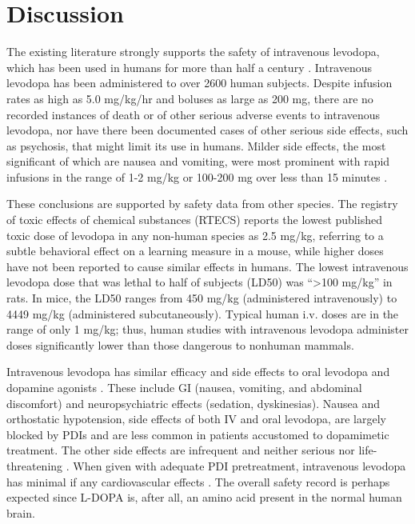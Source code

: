 \section{Discussion}
The existing literature strongly supports the safety of intravenous levodopa, which has been used in humans for more than half a century \cite{14430381}.  Intravenous levodopa has been administered to over 2600 human subjects.  Despite infusion rates as high as 5.0 mg/kg/hr and boluses as large as 200 mg, there are no recorded instances of death or of other serious adverse events to intravenous levodopa, nor have there been documented cases of other serious side effects, such as psychosis, that might limit its use in humans. Milder side effects, the most significant of which are nausea and vomiting, were most prominent with rapid infusions in the range of 1-2 mg/kg or 100-200 mg over less than 15 minutes \cite{5327616,Bbrung_1966,12865145,4555619,6540399,4880674}. 

These conclusions are supported by safety data from other species. The registry of toxic effects of chemical substances (RTECS) reports the lowest published toxic dose of levodopa in any non-human species as 2.5 mg/kg, referring to a subtle behavioral effect on a learning measure in a mouse, while higher doses have not been reported to cause similar effects in humans.  The lowest intravenous levodopa dose that was lethal to half of subjects (LD50) was ``>100 mg/kg'' in rats.  In mice, the LD50 ranges from 450 mg/kg (administered intravenously) to 4449 mg/kg (administered subcutaneously).  Typical human i.v. doses are in the range of only 1 mg/kg; thus, human studies with intravenous levodopa administer doses significantly lower than those dangerous to nonhuman mammals. 

Intravenous levodopa has similar efficacy and side effects to oral levodopa \cite{Connolly_2014} and dopamine agonists \cite{Bonuccelli_2008}.  These include GI (nausea, vomiting, and abdominal discomfort) and neuropsychiatric effects (sedation, dyskinesias).  Nausea and orthostatic hypotension, side effects of both IV and oral levodopa, are largely blocked by PDIs and are less common in patients accustomed to dopamimetic treatment.  The other side effects are infrequent and neither serious nor life-threatening \cite{Connolly_2014}. When given with adequate PDI pretreatment, intravenous levodopa has minimal if any cardiovascular effects \cite{Siddiqi2015}. The overall safety record is perhaps expected since L-DOPA is, after all, an amino acid present in the normal human brain. 

